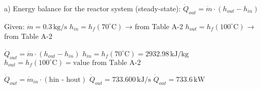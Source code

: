 a) Energy balance for the reactor system (steady-state):  
\( \dot{Q}_{out} = \dot{m} \cdot (h_{out} - h_{in}) \)  

Given:  
\( \dot{m} = 0.3 \, \text{kg/s} \)  
\( h_{in} = h_f(70^\circ \text{C}) \) → from Table A-2  
\( h_{out} = h_f(100^\circ \text{C}) \) → from Table A-2  

\( \dot{Q}_{out} = \dot{m} \cdot (h_{out} - h_{in}) \)  
\( h_{in} = h_f(70^\circ \text{C}) = 2932.98 \, \text{kJ/kg} \)  
\( h_{out} = h_f(100^\circ \text{C}) = \text{value from Table A-2} \)

\( \dot{Q}_{out} = \dot{m}_{in} \cdot (\text{hin - hout}) \)  
\( \dot{Q}_{out} = 733.600 \, \text{kJ/s} \)  
\( \dot{Q}_{out} = 733.6 \, \text{kW} \)